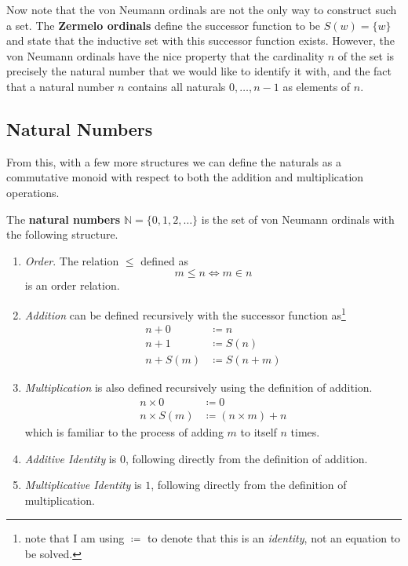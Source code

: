   Now note that the von Neumann ordinals are not the only way to construct such a set. The \textbf{Zermelo ordinals} define the successor function to be $S(w) = \{w\}$ and state that the inductive set with this successor function exists. However, the von Neumann ordinals have the nice property that the cardinality $n$ of the set is precisely the natural number that we would like to identify it with, and the fact that a natural number $n$ contains all naturals $0, \ldots, n-1$ as elements of $n$. 

\subsection{Natural Numbers}

  From this, with a few more structures we can define the naturals as a commutative monoid with respect to both the addition and multiplication operations.

  \begin{definition}
    The \textbf{natural numbers} $\mathbb{N} = \{0, 1, 2, \ldots\}$ is the set of von Neumann ordinals with the following structure. 
    \begin{enumerate}
      \item \textit{Order}. The relation $\leq$ defined as 
      \begin{equation}
        m \leq n \iff m \in n
      \end{equation}
      is an order relation. 

      \item \textit{Addition} can be defined recursively with the successor function as\footnote{note that I am using $\coloneqq$ to denote that this is an \textit{identity}, not an equation to be solved.}
      \begin{align}
        n + 0 & \coloneqq n \\
        n + 1 & \coloneqq S(n) \\  
        n + S(m) & \coloneqq S(n + m)
      \end{align}

      \item \textit{Multiplication} is also defined recursively using the definition of addition.  
      \begin{align}
        n \times 0 & \coloneqq 0 \\
        n \times S(m) & \coloneqq (n \times m) + n
      \end{align}
      which is familiar to the process of adding $m$ to itself $n$ times. 

      \item \textit{Additive Identity} is $0$, following directly from the definition of addition. 
      \item \textit{Multiplicative Identity} is $1$, following directly from the definition of multiplication. 
    \end{enumerate}
  \end{definition} 

